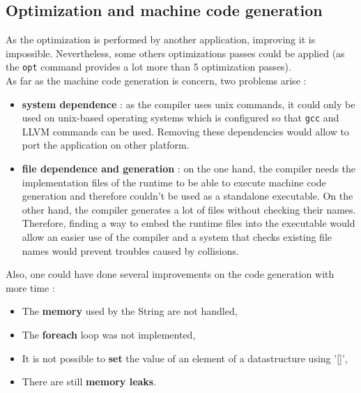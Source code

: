 \documentclass[a4paper,11pt]{article}
\begin{document}
\subsection{Optimization and machine code generation}
As the optimization is performed by another application, improving it is impossible. Nevertheless, some others optimizations passes could be applied (as the \texttt{opt} command provides a lot more than 5 optimization passes). \\
As far as the machine code generation is concern, two problems arise :
\begin{itemize}
	\item \textbf{system dependence} : as the compiler uses unix commands, it could only be used on unix-based operating systems which is configured so that \texttt{gcc} and LLVM commands can be used. Removing these dependencies would allow to port the application on other platform.
	\item \textbf{file dependence and generation} : on the one hand, the compiler needs the implementation files of the runtime to be able to execute machine code generation and therefore couldn't be used as a standalone executable. On the other hand, the compiler generates a lot of files without checking their names. Therefore, finding a way to embed the runtime files into the executable would allow an easier use of the compiler and a system that checks existing file names would prevent troubles caused by collisions.
\end{itemize}

Also, one could have done several improvements on the code generation with more time : 
\begin{itemize}
	\item The \textbf{memory} used by the String are not handled,
	\item The \textbf{foreach} loop was not implemented,
	\item It is not possible to \textbf{set} the value of an element of a datastructure using '[]', 
	\item There are still \textbf{memory leaks}.
\end{itemize}
\end{document}
